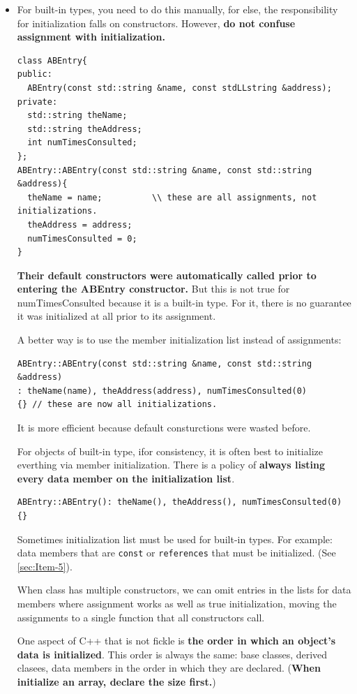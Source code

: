 \begin{itemize}
\item For built-in types, you need to do this manually, for else,
the responsibility for initialization falls on constructors. However,
\textbf{do not confuse assignment with initialization.}
\begin{verbatim}
class ABEntry{
public:
  ABEntry(const std::string &name, const stdLLstring &address);
private:
  std::string theName;
  std::string theAddress;
  int numTimesConsulted;
};
ABEntry::ABEntry(const std::string &name, const std::string &address){
  theName = name;          \\ these are all assignments, not initializations.
  theAddress = address;
  numTimesConsulted = 0;
}
\end{verbatim}
\textbf{Their default constructors were automatically called prior to entering
the ABEntry constructor. }But this is not true for numTimesConsulted
because it is a built-in type. For it, there is no guarantee it was
initialized at all prior to its assignment.

A better way is to use the member initialization list instead of
assignments:
\begin{verbatim}
ABEntry::ABEntry(const std::string &name, const std::string &address)
: theName(name), theAddress(address), numTimesConsulted(0)
{} // these are now all initializations.
\end{verbatim}
It is more efficient because default consturctions were wasted before.

For objects of built-in type, ifor consistency, it is often best to
initialize everthing via member initialization. There is a policy of
\textbf{always listing every data member on the initialization list}.
\begin{verbatim}
ABEntry::ABEntry(): theName(), theAddress(), numTimesConsulted(0)
{}
\end{verbatim}
Sometimes initialization list must be used for built-in types. For
example: data members that are \texttt{const} or \texttt{references}
that must be initialized. (See \ref{sec:Item-5}).

When class has multiple constructors, we can omit entries in the lists
for data members where assignment works as well as true
initialization, moving the assignments to a single function that all
constructors call.

One aspect of C++ that is not fickle is \textbf{the order in which an
  object's data is initialized}. This order is always the same: base
classes, derived clasees, data members in the order in which they are
declared. (\textbf{When initialize an array, declare the size first.})


\end{itemize}
